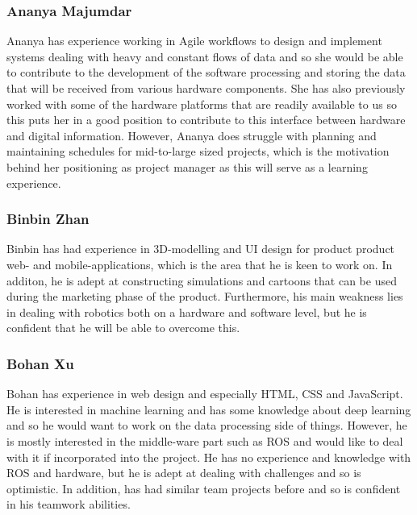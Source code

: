 \documentclass{article}
\begin{document}
\subsubsection{Ananya Majumdar}
Ananya has experience working in Agile workflows to design and implement systems dealing with heavy and constant flows of data and so she would be able to contribute to the development of the software processing and storing the data that will be received from various hardware components. She has also previously worked with some of the hardware platforms that are readily available to us so this puts her in a good position to contribute to this interface between hardware and digital information. However, Ananya does struggle with planning and maintaining schedules for mid-to-large sized projects, which is the motivation behind her positioning as project manager as this will serve as a learning experience.

\subsubsection{Binbin Zhan}
 Binbin has had experience in 3D-modelling and UI design for product product web- and mobile-applications, which is the area that he is keen to work on. In additon, he is adept at constructing simulations and cartoons that can be used during the marketing phase of the product. Furthermore, his main weakness lies in dealing with robotics both on a hardware and software level, but he is confident that he will be able to overcome this.

\subsubsection{Bohan Xu}
Bohan has experience in web design and especially HTML, CSS and JavaScript. He is interested in machine learning and has some knowledge about deep learning and so he would want to work on the data processing side of things. However, he is mostly interested in the middle-ware part such as ROS and would like to deal with it if incorporated into the project. He has no experience and knowledge with ROS and hardware, but he is adept at dealing with challenges and so is optimistic. In addition, has had similar team projects before and so is confident in his teamwork abilities.
\end{document}
